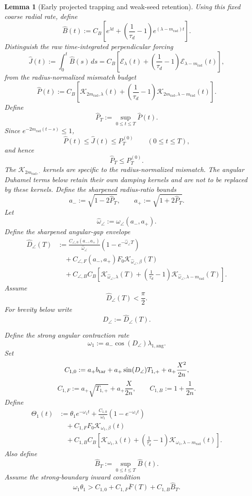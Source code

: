 \documentclass{article} %
\theoremstyle{plain}
\newtheorem{lemma}[theorem]{Lemma}
\theoremstyle{definition}
\theoremstyle{remark}
\begin{document}
\begin{lemma}[Early projected trapping and weak-seed retention]
Using this fixed coarse radial rate, define
\[
\boxed{
\widehat B(t)
:=
C_B
\left[
e^{\lambda t}
+
\left(
\frac1{\tau_d}-1
\right)
e^{(\lambda-m_{\mathrm{rad}})t}
\right].
}
\]
Distinguish the raw time-integrated perpendicular forcing
\[
\boxed{
\widehat J(t)
:=
\int_0^t\widehat B(s)\,ds
=
C_B
\left[
\mathcal E_\lambda(t)
+
\left(
\frac1{\tau_d}-1
\right)
\mathcal E_{\lambda-m_{\mathrm{rad}}}(t)
\right],
}
\]
from the radius-normalized mismatch budget
\[
\boxed{
\widehat P(t)
:=
C_B
\left[
\mathcal K_{2m_{\mathrm{rad}},\lambda}(t)
+
\left(
\frac1{\tau_d}-1
\right)
\mathcal K_{2m_{\mathrm{rad}},\lambda-m_{\mathrm{rad}}}(t)
\right].
}
\]
Define
\[
\boxed{
\widehat P_T
:=
\sup_{0\le t\le T}\widehat P(t).
}
\]
Since $e^{-2m_{\mathrm{rad}}(t-s)}\le1$,
\[
\boxed{
\widehat P(t)
\le
\widehat J(t)
\le
P_T^{(0)}
\qquad
(0\le t\le T),
}
\]
and hence
\[
\boxed{\widehat P_T\le P_T^{(0)}.}
\]
The $\mathcal K_{2m_{\mathrm{rad}},\cdot}$ kernels are specific to the
radius-normalized mismatch.  The angular Duhamel terms below retain their
own damping kernels and are not to be replaced by these kernels.
Define the sharpened radius-ratio bounds
\[
\boxed{
a_-:=\sqrt{1-2\widehat P_T},
\qquad
a_+:=\sqrt{1+2\widehat P_T}.
}
\]
Let
\[
\widehat\omega_\angle
:=
\omega_\angle(a_-,a_+).
\]
Define the sharpened angular-gap envelope
\[
\boxed{
\begin{aligned}
\widehat D_\angle(T)
&:=
\frac{C_{\angle,0}(a_-,a_+)}{\widehat\omega_\angle}
\left(
1-e^{-\widehat\omega_\angle T}
\right)
\\
&\quad+
C_{\angle,F}(a_-,a_+)
F_0
\mathcal K_{\widehat\omega_\angle,\beta}(T)
\\
&\quad+
C_{\angle,B}C_B
\left[
\mathcal K_{\widehat\omega_\angle,\lambda}(T)
+
\left(
\frac1{\tau_d}-1
\right)
\mathcal K_{\widehat\omega_\angle,\lambda-m_{\mathrm{rad}}}(T)
\right].
\end{aligned}
}
\]
Assume
\[
\boxed{
\widehat D_\angle(T)<\frac\pi2.
}
\]
For brevity below write
\[
D_\angle:=\widehat D_\angle(T).
\]

Define the strong angular contraction rate
\[
\boxed{
\omega_1
:=
a_-\cos(D_\angle)\lambda_{1,\mathrm{ang}}.
}
\]
Set
\[
C_{1,0}
:=
a_+b_{\rm tar}
+a_+\sin(D_\angle)T_{1,+}
+
a_+\frac{X^2}{2n},
\]
\[
C_{1,F}
:=
a_+\sqrt{T_{1,+}}
+
a_+\frac{X}{2n},
\qquad
C_{1,B}:=1+\frac1{2n}.
\]
Define
\[
\boxed{
\begin{aligned}
\Theta_1(t)
&:=
\theta_1e^{-\omega_1t}
+
\frac{C_{1,0}}{\omega_1}
\left(
1-e^{-\omega_1t}
\right)
\\
&\quad+
C_{1,F}F_0\mathcal K_{\omega_1,\beta}(t)
\\
&\quad+
C_{1,B}C_B
\left[
\mathcal K_{\omega_1,\lambda}(t)
+
\left(
\frac1{\tau_d}-1
\right)
\mathcal K_{\omega_1,\lambda-m_{\mathrm{rad}}}(t)
\right].
\end{aligned}
}
\]
Also define
\[
\boxed{
\widehat B_T
:=
\sup_{0\le t\le T}\widehat B(t).
}
\]
Assume the strong-boundary inward condition
\[
\boxed{
\omega_1\theta_1
>
C_{1,0}
+
C_{1,F}\overline F(T)
+
C_{1,B}\widehat B_T.
}
\]


\end{lemma}
\end{document}
